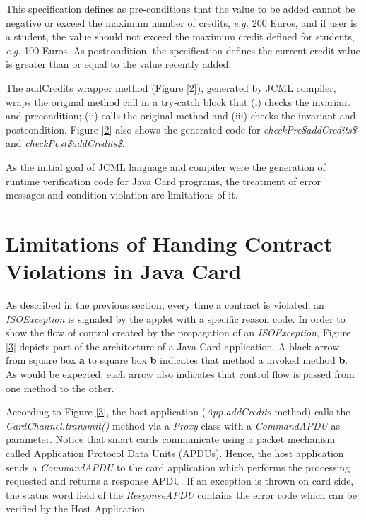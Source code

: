 \documentclass[10pt, conference, compsocconf]{IEEEtran}
\begin{document}
This specification defines as pre-conditions that the
value to be added cannot be negative or exceed the
maximum number of credits, \textit{e.g.} 200 Euros, and if user is
a student, the value should not exceed the maximum
credit defined for students, \textit{e.g.} 100 Euros. As postcondition,
the specification defines the current credit
value is greater than or equal to the value recently added.

The addCredits wrapper method (Figure \ref{2}), generated
by JCML compiler, wraps the original method call in a
try-catch block that (i) checks the invariant and
precondition; (ii) calls the original method and (iii) checks
the invariant and postcondition. Figure \ref{2} also shows the
generated code for \textit{checkPre\$addCredits\$} and
\textit{checkPost\$addCredits\$}.

\begin{figure}

\end{figure}

As the initial goal of JCML language and
compiler were the generation of runtime verification
code for Java Card programs, the treatment of error
messages and condition violation are limitations of it. 

\section{Limitations of Handing Contract Violations in Java Card}
\label{sec:limitation}

As described in the previous section, every time a
contract is violated, an \textit{ISOException} is signaled by the applet with a specific reason code. In order to show the
flow of control created by the propagation of an
\textit{ISOException}, Figure \ref{3} depicts part of the architecture of
a Java Card application. A black arrow from square box \textbf{a}
to square box \textbf{b} indicates that method a invoked method
\textbf{b}. As would be expected, each arrow also indicates that
control flow is passed from one method to the other.

According to Figure \ref{3}, the host application
(\textit{App.addCredits} method) calls the
\textit{CardChannel.transmit()} method via a \textit{Proxy} class with a
\textit{CommandAPDU} as parameter. Notice that smart cards
communicate using a packet mechanism called
Application Protocol Data Units (APDUs). Hence, the
host application sends a \textit{CommandAPDU} to the card
application which performs the processing requested and
returns a response APDU. If an exception is thrown on
card side, the status word field of the \textit{ResponseAPDU}
contains the error code which can be verified by the Host
Application.
\end{document}
